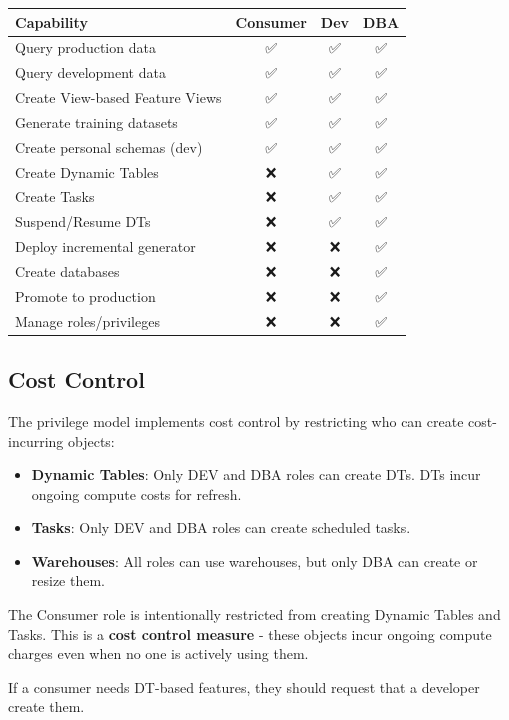 \documentclass[
  letterpaper,
  DIV=11,
  numbers=noendperiod]{scrreprt}
\providecommand{\tightlist}{%
  \setlength{\itemsep}{0pt}\setlength{\parskip}{0pt}}\usepackage{longtable,booktabs,array}
\begin{document}
\begin{longtable}[]{@{}lccc@{}}
\toprule\noalign{}
Capability & Consumer & Dev & DBA \\
\midrule\noalign{}
\endhead
\bottomrule\noalign{}
\endlastfoot
Query production data & ✅ & ✅ & ✅ \\
Query development data & ✅ & ✅ & ✅ \\
Create View-based Feature Views & ✅ & ✅ & ✅ \\
Generate training datasets & ✅ & ✅ & ✅ \\
Create personal schemas (dev) & ✅ & ✅ & ✅ \\
Create Dynamic Tables & ❌ & ✅ & ✅ \\
Create Tasks & ❌ & ✅ & ✅ \\
Suspend/Resume DTs & ❌ & ✅ & ✅ \\
Deploy incremental generator & ❌ & ❌ & ✅ \\
Create databases & ❌ & ❌ & ✅ \\
Promote to production & ❌ & ❌ & ✅ \\
Manage roles/privileges & ❌ & ❌ & ✅ \\
\end{longtable}

\hypertarget{cost-control}{%
\subsection{Cost Control}\label{cost-control}}

The privilege model implements cost control by restricting who can
create cost-incurring objects:

\begin{itemize}
\tightlist
\item
  \textbf{Dynamic Tables}: Only DEV and DBA roles can create DTs. DTs
  incur ongoing compute costs for refresh.
\item
  \textbf{Tasks}: Only DEV and DBA roles can create scheduled tasks.
\item
  \textbf{Warehouses}: All roles can use warehouses, but only DBA can
  create or resize them.
\end{itemize}

\begin{tcolorbox}[enhanced jigsaw, title=\textcolor{quarto-callout-warning-color}{\faExclamationTriangle}\hspace{0.5em}{Consumer Role Restrictions}, colbacktitle=quarto-callout-warning-color!10!white, rightrule=.15mm, arc=.35mm, colframe=quarto-callout-warning-color-frame, left=2mm, bottomtitle=1mm, toptitle=1mm, breakable, bottomrule=.15mm, opacityback=0, titlerule=0mm, toprule=.15mm, opacitybacktitle=0.6, colback=white, coltitle=black, leftrule=.75mm]

The Consumer role is intentionally restricted from creating Dynamic
Tables and Tasks. This is a \textbf{cost control measure} - these
objects incur ongoing compute charges even when no one is actively using
them.

If a consumer needs DT-based features, they should request that a
developer create them.

\end{tcolorbox}
\end{document}
